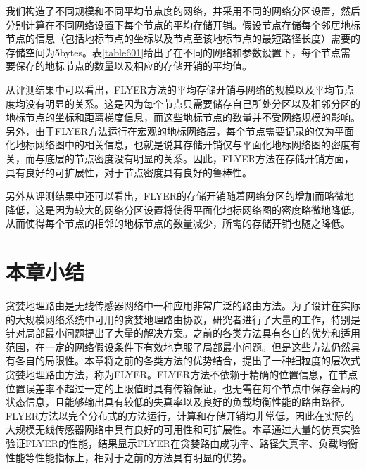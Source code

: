 我们构造了不同规模和不同平均节点度的网络，并采用不同的网络分区设置，然后分别计算在不同网络设置下每个节点的平均存储开销。假设节点存储每个邻居地标节点的信息（包括地标节点的坐标以及节点至该地标节点的最短路径长度）需要的存储空间为5bytes。表\ref{table601}给出了在不同的网络和参数设置下，每个节点需要保存的地标节点的数量以及相应的存储开销的平均值。

从评测结果中可以看出，FLYER方法的平均存储开销与网络的规模以及平均节点度均没有明显的关系。这是因为每个节点只需要储存自己所处分区以及相邻分区的地标节点的坐标和距离梯度信息，而这些地标节点的数量并不受网络规模的影响。另外，由于FLYER方法运行在宏观的地标网络层，每个节点需要记录的仅为平面化地标网络图中的相关信息，也就是说其存储开销仅与平面化地标网络图的密度有关，而与底层的节点密度没有明显的关系。因此，FLYER方法在存储开销方面，具有良好的可扩展性，对于节点密度具有良好的鲁棒性。

另外从评测结果中还可以看出，FLYER的存储开销随着网络分区的增加而略微地降低，这是因为较大的网络分区设置将使得平面化地标网络图的密度略微地降低，从而使得每个节点的相邻的地标节点的数量减少，所需的存储开销也随之降低。
\section{本章小结}
贪婪地理路由是无线传感器网络中一种应用非常广泛的路由方法。为了设计在实际的大规模网络系统中可用的贪婪地理路由协议，研究者进行了大量的工作，特别是针对局部最小问题提出了大量的解决方案。之前的各类方法具有各自的优势和适用范围，在一定的网络假设条件下有效地克服了局部最小问题。但是这些方法仍然具有各自的局限性。本章将之前的各类方法的优势结合，提出了一种细粒度的层次式贪婪地理路由方法，称为FLYER。FLYER方法不依赖于精确的位置信息，在节点位置误差率不超过一定的上限值时具有传输保证，也无需在每个节点中保存全局的状态信息，且能够输出具有较低的失真率以及良好的负载均衡性能的路由路径。FLYER方法以完全分布式的方法运行，计算和存储开销均非常低，因此在实际的大规模无线传感器网络中具有良好的可用性和可扩展性。本章通过大量的仿真实验验证FLYER的性能，结果显示FLYER在贪婪路由成功率、路径失真率、负载均衡性能等性能指标上，相对于之前的方法具有明显的优势。
